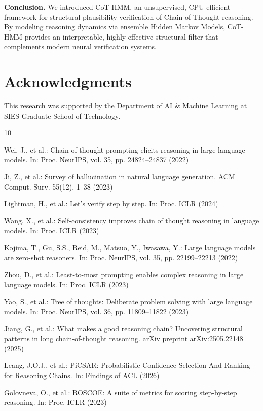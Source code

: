 \documentclass{llncs}
\begin{document}
\textbf{Conclusion.} We introduced CoT-HMM, an unsupervised, CPU-efficient framework for structural plausibility verification of Chain-of-Thought reasoning. By modeling reasoning dynamics via ensemble Hidden Markov Models, CoT-HMM provides an interpretable, highly effective structural filter that complements modern neural verification systems.

\section*{Acknowledgments}
This research was supported by the Department of AI \& Machine Learning at SIES Graduate School of Technology.


\begin{thebibliography}{10}

Wei, J., et al.: Chain-of-thought prompting elicits reasoning in large language models. In: Proc. NeurIPS, vol. 35, pp. 24824--24837 (2022)

Ji, Z., et al.: Survey of hallucination in natural language generation. ACM Comput. Surv. 55(12), 1--38 (2023)

Lightman, H., et al.: Let's verify step by step. In: Proc. ICLR (2024)

Wang, X., et al.: Self-consistency improves chain of thought reasoning in language models. In: Proc. ICLR (2023)

Kojima, T., Gu, S.S., Reid, M., Matsuo, Y., Iwasawa, Y.: Large language models are zero-shot reasoners. In: Proc. NeurIPS, vol. 35, pp. 22199--22213 (2022)

Zhou, D., et al.: Least-to-most prompting enables complex reasoning in large language models. In: Proc. ICLR (2023)

Yao, S., et al.: Tree of thoughts: Deliberate problem solving with large language models. In: Proc. NeurIPS, vol. 36, pp. 11809--11822 (2023)

Jiang, G., et al.: What makes a good reasoning chain? Uncovering structural patterns in long chain-of-thought reasoning. arXiv preprint arXiv:2505.22148 (2025)

Leang, J.O.J., et al.: PiCSAR: Probabilistic Confidence Selection And Ranking for Reasoning Chains. In: Findings of ACL (2026)

Golovneva, O., et al.: ROSCOE: A suite of metrics for scoring step-by-step reasoning. In: Proc. ICLR (2023)


\end{thebibliography}
\end{document}
